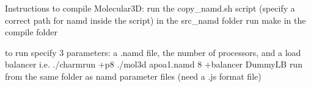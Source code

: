 Instructions to compile Molecular3D:
run the copy_namd.sh script (specify a correct path for namd inside the script) in the src_namd folder
run make in the compile folder

to run specify 3 parameters: a .namd file, the number of processors, and a load balancer 
i.e. ./charmrun +p8 ./mol3d apoa1.namd 8 +balancer DummyLB
run from the same folder as namd parameter files (need a .js format file)

